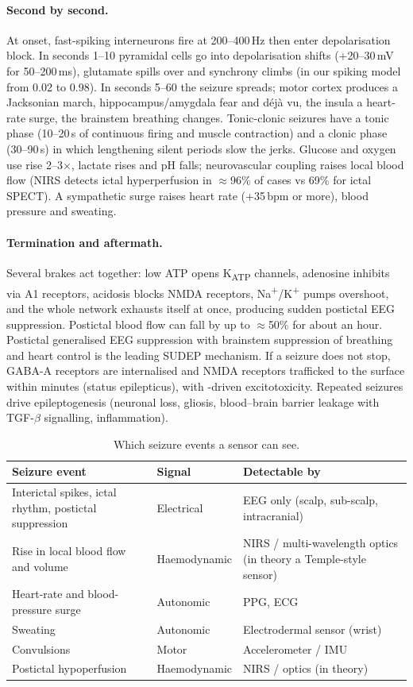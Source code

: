 \paragraph{Second by second.} At onset, fast-spiking interneurons fire at 200--400\,Hz then enter depolarisation block. In seconds 1--10 pyramidal cells go into depolarisation shifts (+20--30\,mV for 50--200\,ms), glutamate spills over and synchrony climbs (in our spiking model from 0.02 to 0.98). In seconds 5--60 the seizure spreads; motor cortex produces a Jacksonian march, hippocampus/amygdala fear and déjà vu, the insula a heart-rate surge, the brainstem breathing changes. Tonic-clonic seizures have a tonic phase (10--20\,s of continuous firing and muscle contraction) and a clonic phase (30--90\,s) in which lengthening silent periods slow the jerks. Glucose and oxygen use rise 2--3$\times$, lactate rises and pH falls; neurovascular coupling raises local blood flow (NIRS detects ictal hyperperfusion in $\approx$96\% of cases vs 69\% for ictal SPECT). A sympathetic surge raises heart rate (+35\,bpm or more), blood pressure and sweating.

\paragraph{Termination and aftermath.} Several brakes act together: low ATP opens K\textsubscript{ATP} channels, adenosine inhibits via A1 receptors, acidosis blocks NMDA receptors, Na\textsuperscript{+}/K\textsuperscript{+} pumps overshoot, and the whole network exhausts itself at once, producing sudden postictal EEG suppression. Postictal blood flow can fall by up to $\approx$50\% for about an hour. Postictal generalised EEG suppression with brainstem suppression of breathing and heart control is the leading SUDEP mechanism. If a seizure does not stop, GABA-A receptors are internalised and NMDA receptors trafficked to the surface within minutes (status epilepticus), with \Catwo-driven excitotoxicity. Repeated seizures drive epileptogenesis (neuronal loss, gliosis, blood--brain barrier leakage with TGF-$\beta$ signalling, inflammation).

\begin{table}[H]
\centering\small
\caption{Which seizure events a sensor can see.}
\begin{tabularx}{\linewidth}{@{}L l L@{}}
\toprule
Seizure event & Signal & Detectable by \\
\midrule
Interictal spikes, ictal rhythm, postictal suppression & Electrical & EEG only (scalp, sub-scalp, intracranial) \\
Rise in local blood flow and volume & Haemodynamic & NIRS / multi-wavelength optics (in theory a Temple-style sensor) \\
Heart-rate and blood-pressure surge & Autonomic & PPG, ECG \\
Sweating & Autonomic & Electrodermal sensor (wrist) \\
Convulsions & Motor & Accelerometer / IMU \\
Postictal hypoperfusion & Haemodynamic & NIRS / optics (in theory) \\
\bottomrule
\end{tabularx}
\end{table}

